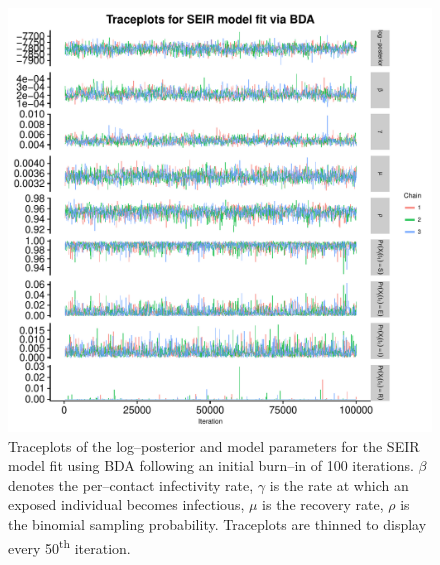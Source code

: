 \begin{figure}[htbp]
	\centering
	\includegraphics[width=0.9\linewidth]{figures/misspec_seir_bda_traceplots.pdf}
	\caption{Traceplots of the log--posterior and model parameters for the SEIR model fit using BDA following an initial burn--in of 100 iterations. $ \beta $ denotes the per--contact infectivity rate, $ \gamma $ is the rate at which an exposed individual becomes infectious, $ \mu $ is the recovery rate, $ \rho $ is the binomial sampling probability. Traceplots are thinned to display every 50\textsuperscript{th} iteration.}
	\label{fig:misspec_seir_bda_traceplots}
\end{figure}

